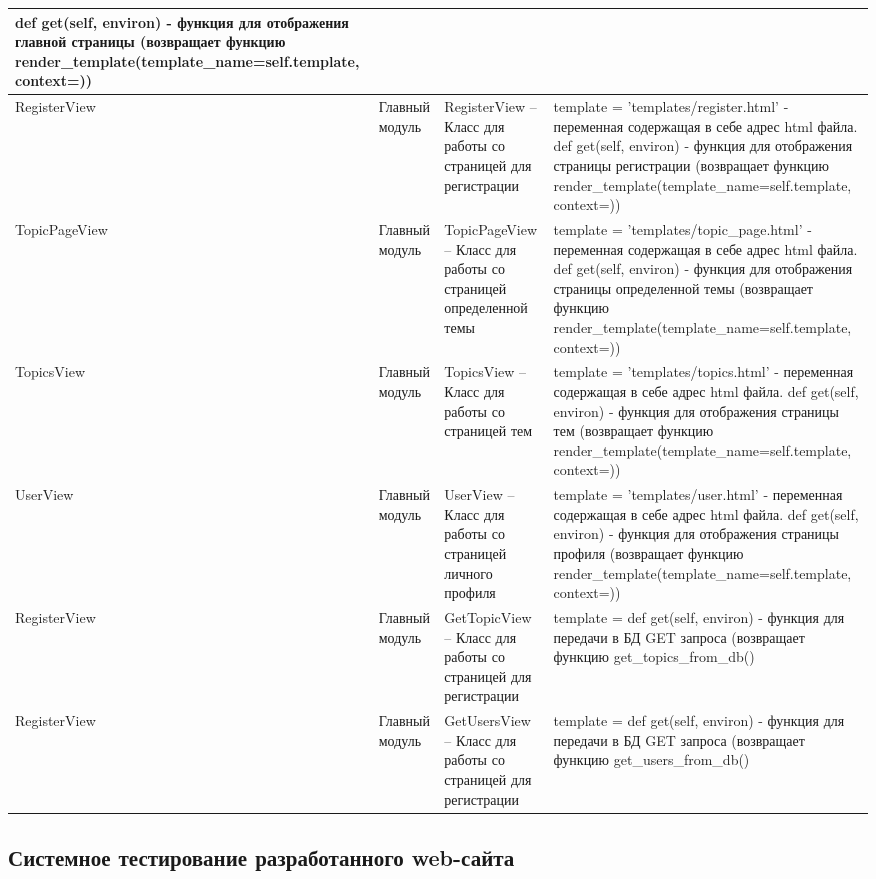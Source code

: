 \begin{xltabular}{\textwidth}{|X|p{2.5cm}|>{\setlength{\baselineskip}{0.7\baselineskip}}p{4.85cm}|>{\setlength{\baselineskip}{0.7\baselineskip}}p{4.85cm}|}
def get(self, environ) - функция для отображения главной страницы (возвращает функцию render\_template(template\_name=self.template, context={})) \\
\hline RegisterView & Главный модуль & RegisterView – Класс для работы со страницей для регистрации & template = 'templates/register.html' - переменная содержащая в себе адрес html файла.
def get(self, environ) - функция для отображения страницы регистрации (возвращает функцию render\_template(template\_name=self.template, context={})) \\
\hline TopicPageView & Главный модуль & TopicPageView – Класс для работы со страницей определенной темы & template = 'templates/topic\_page.html' - переменная содержащая в себе адрес html файла.
def get(self, environ) - функция для отображения страницы определенной темы (возвращает функцию render\_template(template\_name=self.template, context={})) \\
\hline TopicsView & Главный модуль & TopicsView – Класс для работы со страницей тем & template = 'templates/topics.html' - переменная содержащая в себе адрес html файла.
def get(self, environ) - функция для отображения страницы тем (возвращает функцию render\_template(template\_name=self.template, context={})) \\
\hline UserView & Главный модуль & UserView – Класс для работы со страницей личного профиля & template = 'templates/user.html' - переменная содержащая в себе адрес html файла.
def get(self, environ) - функция для отображения страницы профиля (возвращает функцию render\_template(template\_name=self.template, context={})) \\
\hline RegisterView & Главный модуль & GetTopicView – Класс для работы со страницей для регистрации & template = 
def get(self, environ) - функция для передачи в БД GET запроса (возвращает функцию get\_topics\_from\_db() \\
\hline RegisterView & Главный модуль & GetUsersView – Класс для работы со страницей для регистрации & template = 
def get(self, environ) - функция для передачи в БД GET запроса (возвращает функцию get\_users\_from\_db() \\

\end{xltabular}
\renewcommand{\arraystretch}{1.0} %

\newpage
\subsection{Системное тестирование разработанного web-сайта}

